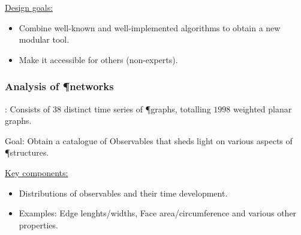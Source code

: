 \documentclass[	hyperref={pdfpagelabels=false}, xcolor=dvipsnames,
		11pt]{beamer}
\begin{document}
\begin{frame}
\begin{columns}
\begin{column}{6cm}
\begin{overprint}
	\end{overprint}
	\end{column}
	\end{columns}

		\begin{alertblock}{\underline{Design goals:}}
		\begin{itemize}
		  	\item Combine well-known and well-implemented algorithms to obtain a new modular tool.
		  	\item Make it accessible for others (\eg non-experts).
		\end{itemize}
		\end{alertblock}
\end{frame}

\begin{frame}
    \frametitle{Analysis of \P networks} 

	\begin{block}{\data:} 
		Consists of $38$ distinct time series of \P graphs, totalling $1998$ weighted planar graphs.
	\end{block}

	\begin{block}{Goal:} 
		Obtain a catalogue of Observables that sheds light on various aspects of \P structures.
	\end{block}

	\begin{alertblock}{\underline{Key components:}}
	 \begin{itemize}
	  \item Distributions of observables and their time development.
	  \item Examples: Edge lenghts/widths, Face area/circumference and various other properties.
	 \end{itemize}
	\end{alertblock}
\end{frame}
\end{document}

